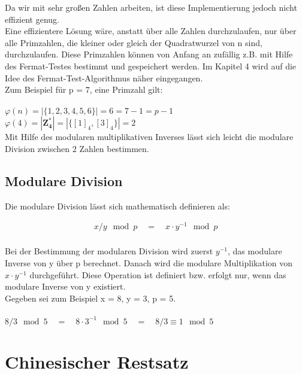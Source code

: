 Da wir mit sehr großen Zahlen arbeiten, ist diese Implementierung jedoch nicht effizient genug. \\
Eine effizientere Lösung wäre, anstatt über alle Zahlen durchzulaufen, nur über alle  Primzahlen, die kleiner oder gleich der Quadratwurzel von n sind, durchzulaufen. Diese Primzahlen können von Anfang an zufällig z.B. mit Hilfe des Fermat-Testes bestimmt und gespeichert werden. Im Kapitel 4 wird auf die Idee des Fermat-Test-Algorithmus näher eingegangen. \\

Zum Beispiel für p = 7, eine Primzahl gilt: \\
\\
  \(\varphi(n) = |\{ 1, 2, 3, 4, 5, 6 \}| = 6 = 7 - 1 = p - 1\) \\

\(\varphi(4) = |\mathbf{Z^*_4}| = |\{ [1]_4, [3]_4 \}| = 2\) \\


Mit Hilfe des modularen multiplikativen Inverses lässt sich leicht die modulare Division zwischen 2 Zahlen bestimmen.


\subsection{Modulare Division}

Die modulare Division lässt sich mathematisch definieren als:
\begin{ceqn}
\begin{align*}
    x/y \mod p \quad = \quad x \cdot y^{-1} \mod p \\
\end{align*}
\end{ceqn}

Bei der Bestimmung der modularen Division wird zuerst $ y^{-1}$, das modulare Inverse von y über p berechnet. Danach wird die modulare Multiplikation von $ x \cdot y^{-1} $ durchgeführt. Diese Operation ist definiert bzw. erfolgt nur, wenn das modulare Inverse von y existiert. 
\\
Gegeben sei zum Beispiel x = 8, y = 3, p = 5. \\
\\
\( 8/3 \mod 5 \quad = \quad 8 \cdot 3^{-1} \mod 5 \quad = \quad 8/3 \equiv 1 \mod 5 \)

\section{Chinesischer Restsatz}


